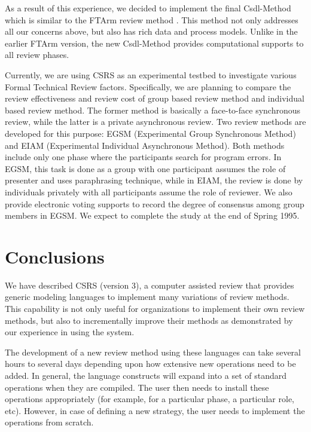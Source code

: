 As a result of this experience, we decided
to implement the final Csdl-Method which is similar to
the FTArm review method \cite{Johnson93,CSDL-93-17}.
This method not only addresses all our concerns above, but also
has rich data and process models. Unlike in the earlier FTArm version,
the new Csdl-Method provides computational supports to all
review phases. 

Currently, we are using CSRS as an experimental testbed to investigate
various Formal Technical Review factors. 
Specifically, we are planning to compare the review effectiveness and
review cost of group based review method and individual based review
method. The former method is basically a face-to-face synchronous
review, while the latter is a private asynchronous review.
Two review methods are developed for this purpose: EGSM (Experimental
Group Synchronous Method) and EIAM (Experimental Individual
Asynchronous Method). Both methods include only one phase where the 
participants search for program errors. In EGSM, this task is done as
a group with one participant assumes the role of presenter and uses
paraphrasing technique, while  in EIAM, the review is done by
individuals privately with all participants assume the role of reviewer.
We also provide electronic voting supports to record the degree of
consensus among group members in EGSM.
We expect to complete the study at the end of Spring 1995.



\section{Conclusions}

We have described CSRS (version 3), a computer assisted review that
provides generic modeling languages to implement many variations of
review methods. This capability is not only useful for organizations
to implement their own review methods, but also to incrementally
improve their methods as demonstrated by our experience in using the
system. 

The development of a new review method using these languages 
can take several hours to several days depending upon how extensive new
operations need to be added. 
In general, the language constructs  will
expand into a set 
of standard operations when they are compiled. The user
then needs to install these operations appropriately (for example, for
a particular phase, a particular role, etc). However, in case
of defining a new strategy, the user needs to implement the
operations from scratch.

